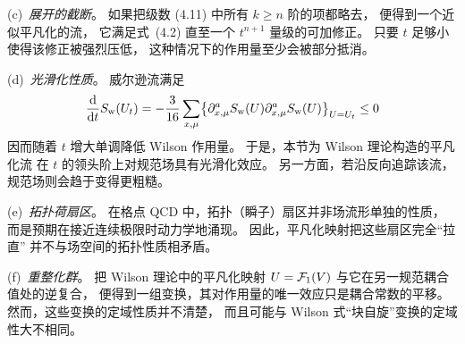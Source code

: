 \smallskip
\noindent
(c)~{\itshape 展开的截断}。
如果把级数 (4.11) 中所有 $k\geq n$ 阶的项都略去，
便得到一个近似平凡化的流，
它满足式~(4.2) 直至一个 $t^{n+1}$ 量级的可加修正。
只要 $t$ 足够小使得该修正被强烈压低，
这种情况下的作用量至少会被部分抵消。

\smallskip
\noindent
(d)~{\itshape 光滑化性质}。
威尔逊流满足
\begin{equation}
  {\mathrm{d}\over\mathrm{d}t}S_{\mathrm{w}}(U_t)=-\frac{3}{16}\sum_{x,\mu}
  \bigl\{\partial^a_{x,\mu}S_{\mathrm{w}}(U)
  \partial^a_{x,\mu}S_{\mathrm{w}}(U)\bigr\}_{U=U_t}\leq 0
\end{equation}
因而随着 $t$ 增大单调降低 Wilson 作用量。
于是，本节为 Wilson 理论构造的平凡化流
在 $t$ 的领头阶上对规范场具有光滑化效应。
另一方面，若沿反向追踪该流，
规范场则会趋于变得更粗糙。

\smallskip
\noindent
(e)~{\itshape 拓扑荷扇区}。
在格点 QCD 中，拓扑（瞬子）扇区并非场流形单独的性质，
而是预期在接近连续极限时动力学地涌现。
因此，平凡化映射把这些扇区完全``拉直''
并不与场空间的拓扑性质相矛盾。

\smallskip
\noindent
(f)~{\itshape 重整化群}。
把 Wilson 理论中的平凡化映射 $U=\mathcal{F}_1(V)$
与它在另一规范耦合值处的逆复合，
便得到一组变换，其对作用量的唯一效应只是耦合常数的平移。
然而，这些变换的定域性质并不清楚，
而且可能与 Wilson 式``块自旋''变换的定域性大不相同。
